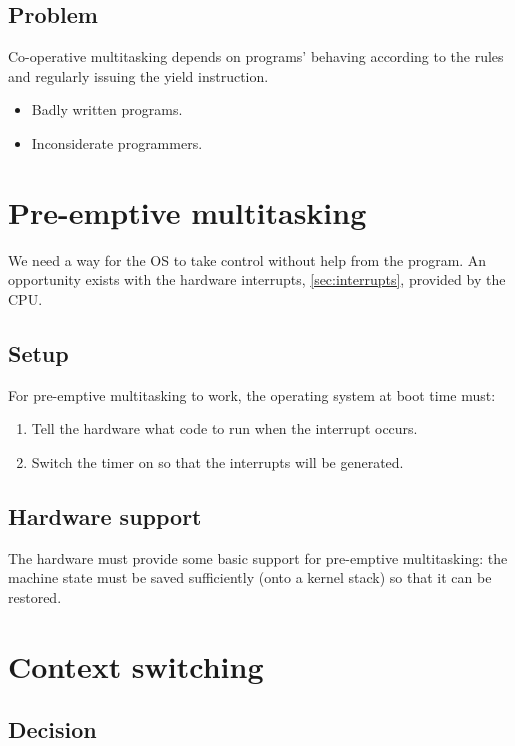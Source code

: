 \subsection{Problem}

Co-operative multitasking depends on programs' behaving according to the rules and regularly issuing the yield instruction.
\begin{itemize}
\item Badly written programs.
\item Inconsiderate programmers.
\end{itemize}


\section{Pre-emptive multitasking}

We need a way for the OS to take control without help from the program.
An opportunity exists with the hardware interrupts, \autoref{sec:interrupts}, provided by the CPU.

\subsection{Setup}

For pre-emptive multitasking to work, the operating system at boot time must:

\begin{enumerate}
\item Tell the hardware what code to run when the interrupt occurs.
\item Switch the timer on so that the interrupts will be generated.
\end{enumerate}

\subsection{Hardware support}

The hardware must provide some basic support for pre-emptive multitasking: the machine state must be saved sufficiently (onto a kernel stack) so that it can be restored. 

\section{Context switching}

\subsection{Decision}

